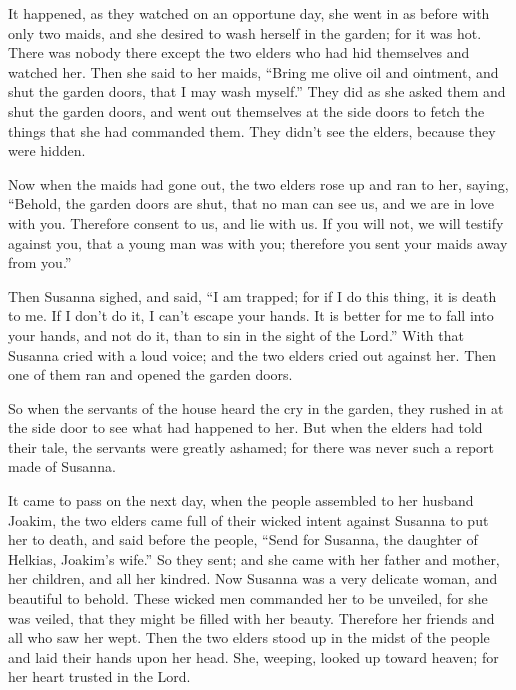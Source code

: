  It happened, as they watched on an opportune day, she went
in as before with only two maids, and she desired to wash herself in the
garden; for it was hot.  There was nobody there except the
two elders who had hid themselves and watched her.  Then
she said to her maids, ``Bring me olive oil and ointment, and shut the
garden doors, that I may wash myself.''  They did as she
asked them and shut the garden doors, and went out themselves at the
side doors to fetch the things that she had commanded them. They didn't
see the elders, because they were hidden.

 Now when the maids had gone out, the two elders rose up
and ran to her, saying,  ``Behold, the garden doors are
shut, that no man can see us, and we are in love with you. Therefore
consent to us, and lie with us.  If you will not, we will
testify against you, that a young man was with you; therefore you sent
your maids away from you.''

 Then Susanna sighed, and said, ``I am trapped; for if I do
this thing, it is death to me. If I don't do it, I can't escape your
hands.  It is better for me to fall into your hands, and
not do it, than to sin in the sight of the Lord.''  With
that Susanna cried with a loud voice; and the two elders cried out
against her.  Then one of them ran and opened the garden
doors.

 So when the servants of the house heard the cry in the
garden, they rushed in at the side door to see what had happened to her.
 But when the elders had told their tale, the servants were
greatly ashamed; for there was never such a report made of Susanna.

 It came to pass on the next day, when the people assembled
to her husband Joakim, the two elders came full of their wicked intent
against Susanna to put her to death,  and said before the
people, ``Send for Susanna, the daughter of Helkias, Joakim's wife.'' So
they sent;  and she came with her father and mother, her
children, and all her kindred.  Now Susanna was a very
delicate woman, and beautiful to behold.  These wicked men
commanded her to be unveiled, for she was veiled, that they might be
filled with her beauty.  Therefore her friends and all who
saw her wept.  Then the two elders stood up in the midst of
the people and laid their hands upon her head.  She,
weeping, looked up toward heaven; for her heart trusted in the Lord.

